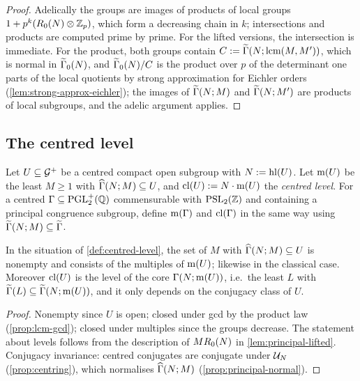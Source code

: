 \begin{proof}
Adelically the groups are images of products of local groups
$1 + p^{k}(R_{0}(N)\otimes\mathbb{Z}_{p})$, which form a decreasing
chain in $k$; intersections and products are computed prime by prime. For
the lifted versions, the intersection is immediate. For the product, both
groups contain $C := \GammaPrincipal[lift]{N}{\mathrm{lcm}(M,M')}$, which is
normal in $\GammaZero[lift]{N}$, and $\GammaZero[lift]{N}/C$ is the product
over $p$ of the determinant one parts of the local quotients by strong
approximation for Eichler orders (\cref{lem:strong-approx-eichler}); the
images of $\GammaPrincipal[lift]{N}{M}$ and $\GammaPrincipal[lift]{N}{M'}$ are
products of local subgroups, and the adelic argument applies.
\end{proof}

\subsection{The centred level}

\begin{definition}\label{def:centred-level}
Let $U \subseteq \mathcal{G}^{+}$ be a centred compact open subgroup with
$N := \operatorname{hl}(U)$. Let $\operatorname{m}(U)$ be the least
$M \geq 1$ with $\GammaPrincipal[ad]{N}{M} \subseteq U$, and
$\operatorname{cl}(U) := N\cdot\operatorname{m}(U)$ the \emph{centred
level}. For a centred $\Gamma \subseteq \mathrm{PGL}_{2}^{+}(\mathbb{Q})$ commensurable
with $\PSL{2}{\ZZ}$ and containing a principal congruence subgroup, define
$\operatorname{m}(\Gamma)$ and $\operatorname{cl}(\Gamma)$ in the same way
using $\GammaPrincipal[lift]{N}{M} \subseteq \lifted{\Gamma}$.
\end{definition}

\begin{lemma}\label{lem:centred-level-well-defined}
In the situation of \cref{def:centred-level}, the set of $M$ with
$\GammaPrincipal[ad]{N}{M} \subseteq U$ is nonempty and consists of the
multiples of $\operatorname{m}(U)$; likewise in the classical case.
Moreover $\operatorname{cl}(U)$ is the level of the core
$\GammaPrincipal{N}{\CentredLevelQuotient{U}}$, i.e.\ the least $L$ with
$\GammaFull[lift]{L} \subseteq \GammaPrincipal[lift]{N}{\CentredLevelQuotient{U}}$,
and it only depends on the conjugacy class of $U$.
\end{lemma}

\begin{proof}
Nonempty since $U$ is open; closed under gcd by the product law
(\cref{prop:lcm-gcd}); closed under multiples since the groups decrease.
The statement about levels follows from the description of
$MR_{0}(N)$ in \cref{lem:principal-lifted}. Conjugacy invariance:
centred conjugates are conjugate under $\mathcal{U}_{N}$ (\cref{prop:centring}),
which normalises $\GammaPrincipal[ad]{N}{M}$ (\cref{prop:principal-normal}).
\end{proof}

